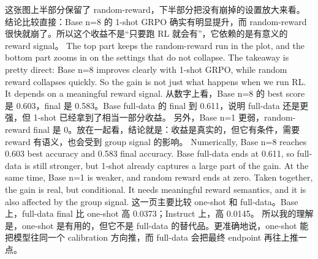 {}这张图上半部分保留了 random-reward，下半部分把没有崩掉的设置放大来看。\markdownRendererInterblockSeparator
{}结论比较直接：Base n=8 的 1-shot GRPO 确实有明显提升，而 random-reward 很快就崩了。所以这个收益不是“只要跑 RL 就会有”，它依赖的是有意义的 reward signal。\markdownRendererInterblockSeparator
{}\markdownRendererInterblockSeparator
{}The top part keeps the random-reward run in the plot, and the bottom part zooms in on the settings that do not collapse.\markdownRendererInterblockSeparator
{}The takeaway is pretty direct: Base n=8 improves clearly with 1-shot GRPO, while random reward collapses quickly. So the gain is not just what happens when we run RL. It depends on a meaningful reward signal.\markdownRendererInterblockSeparator
{}\markdownRendererHorizontalRule{}\markdownRendererInterblockSeparator
{}\markdownRendererInterblockSeparator
{}\markdownRendererInterblockSeparator
{}从数字上看，Base n=8 的 best score 是 0.603，final 是 0.583。Base full-data 的 final 到 0.611，说明 full-data 还是更强，但 1-shot 已经拿到了相当一部分收益。\markdownRendererInterblockSeparator
{}另外，Base n=1 更弱，random-reward final 是 0。放在一起看，结论就是：收益是真实的，但它有条件，需要 reward 有语义，也会受到 group signal 的影响。\markdownRendererInterblockSeparator
{}\markdownRendererInterblockSeparator
{}Numerically, Base n=8 reaches 0.603 best accuracy and 0.583 final accuracy. Base full-data ends at 0.611, so full-data is still stronger, but 1-shot already captures a large part of the gain.\markdownRendererInterblockSeparator
{}At the same time, Base n=1 is weaker, and random reward ends at zero. Taken together, the gain is real, but conditional. It needs meaningful reward semantics, and it is also affected by the group signal.\markdownRendererInterblockSeparator
{}\markdownRendererHorizontalRule{}\markdownRendererInterblockSeparator
{}\markdownRendererInterblockSeparator
{}\markdownRendererInterblockSeparator
{}这一页主要比较 one-shot 和 full-data。Base 上，full-data final 比 one-shot 高 0.0373；Instruct 上，高 0.0145。\markdownRendererInterblockSeparator
{}所以我的理解是，one-shot 是有用的，但它不是 full-data 的替代品。更准确地说，one-shot 能把模型往同一个 calibration 方向推，而 full-data 会把最终 endpoint 再往上推一点。\markdownRendererInterblockSeparator
